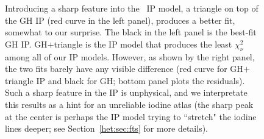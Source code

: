 \begin{figure}
\centering
{}
\caption{Introducing a sharp feature into the \het\ IP model, a
  triangle on top of the GH IP (red curve in the left panel), produces
  a better fit, somewhat to our surprise. The black in the left panel
  is the best-fit GH IP. GH$+$triangle is the IP model that produces
  the least $\chi^2_\nu$ among all of our IP models. However, as shown
  by the right panel, the two fits barely have any visible difference
  (red curve for GH$+$triangle IP and black for GH; bottom panel plots
  the residuals). Such a sharp feature in the IP is unphysical, and we
  interpretate this results as a hint for an unreliable iodine atlas
  (the sharp peak at the center is perhaps the IP model trying to
  ``stretch" the iodine lines deeper; see Section~\ref{het:sec:fts}
  for more details).
\label{het:fig:iodipcomp}}
\end{figure}



